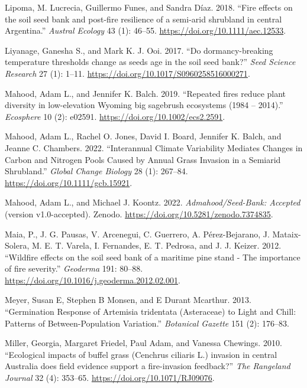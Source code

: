 \documentclass[
  12pt,
]{article}
\newlength{\cslhangindent}
\newlength{\cslentryspacingunit} %
\newenvironment{CSLReferences}[2] %
 {%
  \setlength{\parindent}{0pt}
  \ifodd #1
  \let\oldpar\par
  \def\par{\hangindent=\cslhangindent\oldpar}
  \fi
  \setlength{\parskip}{#2\cslentryspacingunit}
 }%
 {}
\begin{document}
\begin{CSLReferences}{1}{0}
\leavevmode{}%
Lipoma, M. Lucrecia, Guillermo Funes, and Sandra Díaz. 2018. {``{Fire
effects on the soil seed bank and post-fire resilience of a semi-arid
shrubland in central Argentina}.''} \emph{Austral Ecology} 43 (1):
46--55. \url{https://doi.org/10.1111/aec.12533}.

\leavevmode{}%
Liyanage, Ganesha S., and Mark K. J. Ooi. 2017. {``{Do dormancy-breaking
temperature thresholds change as seeds age in the soil seed bank?}''}
\emph{Seed Science Research} 27 (1): 1--11.
\url{https://doi.org/10.1017/S0960258516000271}.

\leavevmode{}%
Mahood, Adam L., and Jennifer K. Balch. 2019. {``{Repeated fires reduce
plant diversity in low-elevation Wyoming big sagebrush ecosystems (1984
-- 2014)}.''} \emph{Ecosphere} 10 (2): e02591.
\url{https://doi.org/10.1002/ecs2.2591}.

\leavevmode{}%
Mahood, Adam L., Rachel O. Jones, David I. Board, Jennifer K. Balch, and
Jeanne C. Chambers. 2022. {``Interannual Climate Variability Mediates
Changes in Carbon and Nitrogen Pools Caused by Annual Grass Invasion in
a Semiarid Shrubland.''} \emph{Global Change Biology} 28 (1): 267--84.
\url{https://doi.org/10.1111/gcb.15921}.

\leavevmode{}%
Mahood, Adam L., and Michael J. Koontz. 2022. \emph{Admahood/Seed-Bank:
Accepted} (version v1.0-accepted). Zenodo.
\url{https://doi.org/10.5281/zenodo.7374835}.

\leavevmode{}%
Maia, P., J. G. Pausas, V. Arcenegui, C. Guerrero, A. Pérez-Bejarano, J.
Mataix-Solera, M. E. T. Varela, I. Fernandes, E. T. Pedrosa, and J. J.
Keizer. 2012. {``{Wildfire effects on the soil seed bank of a maritime
pine stand - The importance of fire severity}.''} \emph{Geoderma} 191:
80--88. \url{https://doi.org/10.1016/j.geoderma.2012.02.001}.

\leavevmode{}%
Meyer, Susan E, Stephen B Monsen, and E Durant Mcarthur. 2013.
{``{Germination Response of Artemisia tridentata (Asteraceae) to Light
and Chill: Patterns of Between-Population Variation}.''} \emph{Botanical
Gazette} 151 (2): 176--83.

\leavevmode{}%
Miller, Georgia, Margaret Friedel, Paul Adam, and Vanessa Chewings.
2010. {``{Ecological impacts of buffel grass (Cenchrus ciliaris L.)
invasion in central Australia does field evidence support a
fire-invasion feedback?}''} \emph{The Rangeland Journal} 32 (4):
353--65. \url{https://doi.org/10.1071/RJ09076}.


\end{CSLReferences}
\end{document}
